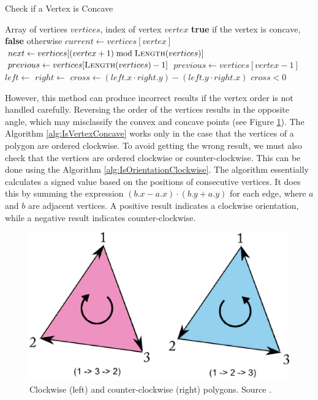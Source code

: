 \algrenewcommand{}
\algrenewcommand{}
\renewcommand{\alglinenumber}[1]{#1.}  %
\begin{algorithm}[H]
\caption{Check if a Vertex is Concave}\label{alg:IsVertexConcave}
\begin{algorithmic}[1]
\Require Array of vertices $vertices$, index of vertex $vertex$
\Ensure \textbf{true} if the vertex is concave, \textbf{false} otherwise
\Statex
{}
    \State $current \gets vertices[vertex]$
    \State $next \gets vertices[(vertex + 1) \bmod \Call{Length}{vertices}]$
        \State $previous \gets vertices[\Call{Length}{vertices} - 1]$
    \Else
        \State $previous \gets vertices[vertex - 1]$
    \EndIf
    \State $left \gets$ 
    \State $right \gets$ 
    \State $cross \gets (left.x \cdot right.y) - (left.y \cdot right.x)$
    \State \Return $cross < 0$
\EndFunction
\end{algorithmic}
\end{algorithm}

However, this method can produce incorrect results if the vertex order is not handled carefully. Reversing the order of the vertices results in the opposite angle, which may misclassify the convex and concave points (see Figure \ref{fig:Clock}). The Algorithm \ref{alg:IsVertexConcave} works only in the case that the vertices of a polygon are ordered clockwise. To avoid getting the wrong result, we must also check that the vertices are ordered clockwise or counter-clockwise. This can be done using the Algorithm \ref{alg:IsOrientationClockwise}.
The algorithm essentially calculates a signed value based on the positions of consecutive vertices. It does this by summing the expression $(b.x-a.x)\cdot(b.y+a.y)$ for each edge, where $a$ and $b$ are adjacent vertices. A positive result indicates a clockwise orientation, while a negative result indicates counter-clockwise.

\begin{figure}[H]
\centering
\includegraphics[width=.6\linewidth]{img/clock.png}
\caption{Clockwise (left) and counter-clockwise (right) polygons. Source \cite{Clock}.}
\label{fig:Clock}
\end{figure}

